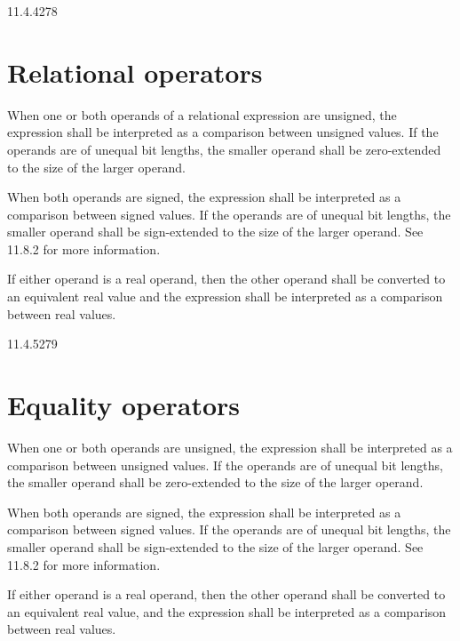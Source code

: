 \documentclass{article}
\begin{document}
\begin{lrmquote}{11.4.4}{278}
  \section{Relational operators}

  \textelp{}

  When one or both operands of a relational expression are unsigned, the
  expression shall be interpreted as a comparison between unsigned values.
    {
      \color{red}
      If the operands are of unequal bit lengths, the smaller operand
      shall be zero-extended to the size of the larger operand.
    }

  When both operands are signed, the expression shall be interpreted as a
  comparison between signed values.
    {
      \color{red}
      If the operands are of unequal bit
      lengths, the smaller operand shall be sign-extended to the size of the larger
      operand. See 11.8.2 for more information.
    }

  If either operand is a real operand, then the other operand shall be converted to
  an equivalent real value and the expression shall be interpreted as a comparison
  between real values.

  \textelp{}
\end{lrmquote}

\begin{lrmquote}{11.4.5}{279}
  \section{Equality operators}

  \textelp{}

  When one or both operands are unsigned, the expression shall be interpreted as a
  comparison between unsigned values.
    {
      \color{red}
      If the operands are of unequal bit
      lengths, the smaller operand shall be zero-extended to the size of the larger
      operand.
    }

  When both operands are signed, the expression shall be interpreted as a
  comparison between signed values.
    {
      \color{red}
      If the operands are of unequal bit
      lengths, the smaller operand shall be sign-extended to the size of the larger
      operand. See 11.8.2 for more information.
    }

  If either operand is a real operand, then the other operand shall be converted
  to an equivalent real value, and the expression shall be interpreted as a
  comparison between real values.

  \textelp{}
\end{lrmquote}
\end{document}
